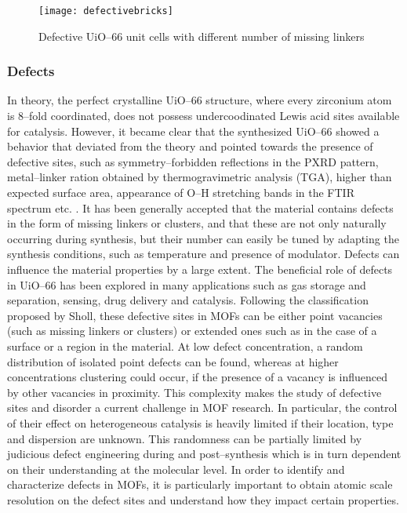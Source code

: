 \begin{figure}[!htbp]
	\centering
 	\texttt{[image: defectivebricks]}
	\caption{Defective UiO--66 unit cells with different number of missing linkers}
	\label{fig:defectivebricks}
\end{figure}

\subsubsection{Defects}
In theory, the perfect crystalline UiO--66 structure, where every zirconium atom is 8--fold coordinated, does not possess undercoodinated Lewis acid sites available for catalysis. However, it became clear that the synthesized UiO--66 showed a behavior that deviated from the theory and pointed towards the presence of defective sites, such as symmetry--forbidden reflections in the PXRD pattern, metal--linker ration obtained by thermogravimetric analysis (TGA), higher than expected surface area, appearance of O--H stretching bands in the FTIR spectrum etc. \cite{shearer2014tuned, valenzano2011disclosing}. It has been generally accepted that the material contains defects in the form of missing linkers or clusters, and that these are not only naturally occurring during synthesis, but their number can easily be tuned by adapting the synthesis conditions, such as temperature and presence of modulator\cite{wu2013unusual, shearer2016defect}.
Defects can influence the material properties by a large extent. The beneficial role of defects in UiO--66 has been explored in many applications such as gas storage and separation\cite{wu2013unusual, ren2014modulated}, sensing\cite{stassen2016towards}, drug delivery\cite{cunha2013rationale} and catalysis\cite{vermoortele2013synthesis, rogge2017metal}. 
Following the classification proposed by Sholl, these defective sites in MOFs can be either point vacancies (such as missing linkers or clusters) or extended ones such as in the case of a surface \cite{sholl2015defects} or a region in the material. At low defect concentration, a random distribution of isolated point defects can be found, whereas at higher concentrations clustering could occur, if the presence of a vacancy is influenced by other vacancies in proximity. This complexity makes the study of defective sites and disorder a current challenge in MOF research. In particular, the control of their effect on heterogeneous catalysis is heavily limited if their location, type and dispersion are unknown. This randomness can be partially limited by judicious defect engineering during and post--synthesis which is in turn dependent on their understanding at the molecular level. In order to identify and characterize defects in MOFs, it is particularly important to obtain atomic scale resolution on the defect sites and understand how they impact certain properties.
